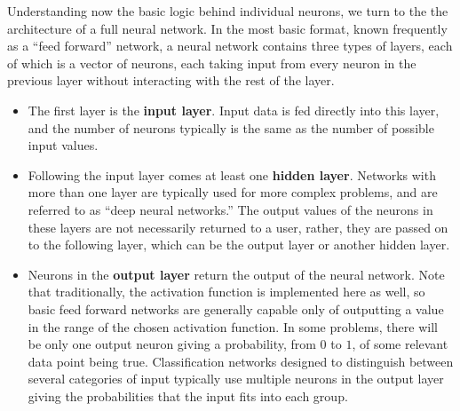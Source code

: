 \documentclass{article}
\begin{document}
\begin{center}
\end{center}

Understanding now the basic logic behind individual neurons, we turn to the the architecture of a full neural network. In the most basic format, known frequently as a ``feed forward'' network, a neural network contains three types of layers, each of which is a vector of neurons, each taking input from every neuron in the previous layer without interacting with the rest of the layer.
\begin{itemize}
\item{The first layer is the \textbf{input layer}. Input data is fed directly into this layer, and the number of neurons typically is the same as the number of possible input values.}
\item{Following the input layer comes at least one \textbf{hidden layer}. Networks with more than one layer are typically used for more complex problems, and are referred to as ``deep neural networks.'' The output values of the neurons in these layers are not necessarily returned to a user, rather, they are passed on to the following layer, which can be the output layer or another hidden layer.}
\item{Neurons in the \textbf{output layer} return the output of the neural network. Note that traditionally, the activation function is implemented here as well, so basic feed forward networks are generally capable only of outputting a value in the range of the chosen activation function. In some problems, there will be only one output neuron giving a probability, from $0$ to $1$, of some relevant data point being true. Classification networks designed to distinguish between several categories of input typically use multiple neurons in the output layer giving the probabilities that the input fits into each group.}
\end{itemize}
\end{document}
